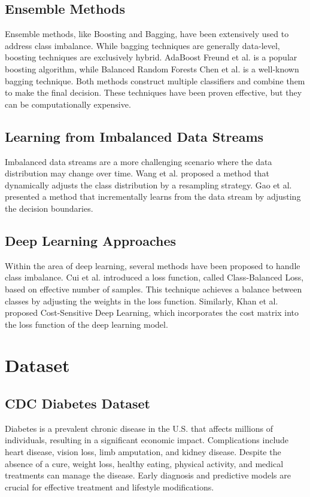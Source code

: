 \documentclass[journal]{IEEEtran}
\begin{document}
	\subsection{Ensemble Methods} 
	
	Ensemble methods, like Boosting and Bagging, have been extensively used to address class imbalance. While bagging techniques are generally data-level, boosting techniques are exclusively hybrid.
	AdaBoost Freund et al. \cite{freund1997} is a popular boosting algorithm, while Balanced Random Forests Chen et al. \cite{chen2004} is a well-known bagging technique. Both methods construct multiple classifiers and combine them to make the final decision. These techniques have been proven effective, but they can be computationally expensive.
	
	\subsection{Learning from Imbalanced Data Streams} 
	
	Imbalanced data streams are a more challenging scenario where the data distribution may change over time. Wang et al. \cite{wang2018} proposed a method that dynamically adjusts the class distribution by a resampling strategy. Gao et al. \cite{gao2015} presented a method that incrementally learns from the data stream by adjusting the decision boundaries.
	
	\subsection{Deep Learning Approaches}
	Within the area of deep learning, several methods have been proposed to handle class imbalance. Cui et al. \cite{cui2019} introduced a loss function, called Class-Balanced Loss, based on effective number of samples. This technique achieves a balance between classes by adjusting the weights in the loss function. Similarly, Khan et al. \cite{khan2017} proposed Cost-Sensitive Deep Learning, which incorporates the cost matrix into the loss function of the deep learning model.	
	
	\section{Dataset}
	\label{sec:dataset}
	
	\subsection{CDC Diabetes Dataset}
	\cite{cdc2022}
	Diabetes is a prevalent chronic disease in the U.S. that affects millions of individuals, resulting in a significant economic impact. Complications include heart disease, vision loss, limb amputation, and kidney disease. Despite the absence of a cure, weight loss, healthy eating, physical activity, and medical treatments can manage the disease. Early diagnosis and predictive models are crucial for effective treatment and lifestyle modifications.
	
\end{document}
